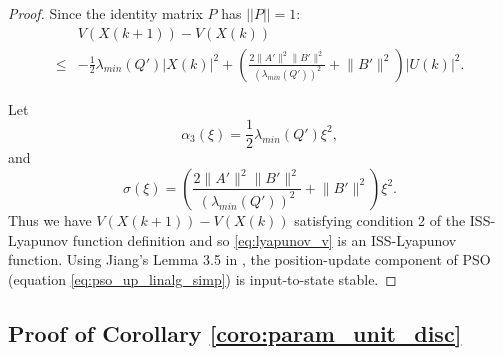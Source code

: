 \documentclass{sig-alternate}
\begin{document}
\begin{proof}
Since the identity matrix $ P $ has $ || P || = 1 $:
\begin{equation}
\label{eq:lyapunov_delta5}
\begin{aligned}
& V( X(k+1) ) - V( X(k) ) \\
	\leq & - \frac{1}{2} \lambda_{min}(Q') | X(k) |^{2} + \left( \frac{2 \lVert A' \rVert^{2} \lVert B' \rVert^{2}}{ ( \lambda_{min}(Q') )^{2} } + \lVert B' \rVert^{2} \right) | U(k) |^{2}.
\end{aligned}
\end{equation}
		
Let
\begin{equation}
\nonumber
\alpha_{3} ( \xi )= \frac{1}{2} \lambda_{min}(Q') \xi^{2} ,
\end{equation}
and
\begin{equation}
\nonumber
\sigma ( \xi ) = \left( \frac{2 \lVert A' \rVert^{2} \lVert B' \rVert^{2}}{ ( \lambda_{min}(Q') )^{2} } +  \lVert B' \rVert^{2} \right) \xi^{2} .
\end{equation} 
Thus we have $  V( X(k+1) ) - V( X(k) ) $ satisfying condition 2 of the ISS-Lyapunov function definition and
so \eqref{eq:lyapunov_v} is an ISS-Lyapunov function.
Using Jiang's Lemma 3.5 in \cite{Jiang2001857}, the position-update component of PSO (equation \eqref{eq:pso_up_linalg_simp}) is input-to-state stable.
\end{proof}

\subsection{Proof of Corollary \ref{coro:param_unit_disc}}
\label{sec:coro:param_unit_disc:proof}
\end{document}
